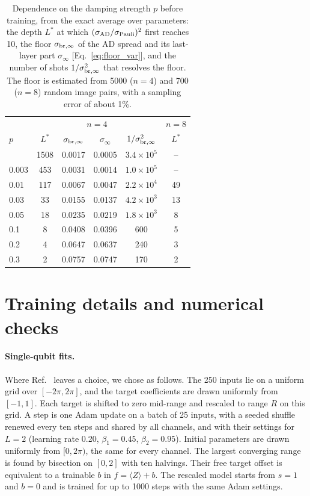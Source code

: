 \documentclass[
 aps,pra,
 twocolumn,
 superscriptaddress,
 longbibliography,
 nofootinbib
]{revtex4-2}
\newcommand{\AD}{\mathrm{AD}}
\begin{document}
\begin{table}[t]
\caption{Dependence on the damping strength $p$ before training, from the
exact average over parameters: the depth $L^*$ at which
$(\sigma_{\AD}/\sigma_{\rm Pauli})^2$ first reaches 10, the floor
$\sigma_{\rm br,\infty}$ of the AD spread and its last-layer part $\sigma_\infty$
[Eq.~\eqref{eq:floor_var}], and the number of shots
$1/\sigma_{\rm br,\infty}^2$ that resolves the floor. The floor is estimated from 5000 ($n=4$) and 700 ($n=8$) random image pairs, with a sampling error of about 1\%.}
\label{tab:pdep}
\begin{ruledtabular}
\begin{tabular}{lccccc}
 & \multicolumn{4}{c}{$n=4$} & $n=8$\\
$p$ & $L^*$ & $\sigma_{\rm br,\infty}$ & $\sigma_\infty$ & $1/\sigma_{\rm br,\infty}^2$ & $L^*$\\
\colrule
0.001 & 1508 & 0.0017 & 0.0005 & $3.4\times10^5$ & --\\
0.003 & 453 & 0.0031 & 0.0014 & $1.0\times10^5$ & --\\
0.01 & 117 & 0.0067 & 0.0047 & $2.2\times10^4$ & 49\\
0.03 & 33 & 0.0155 & 0.0137 & $4.2\times10^3$ & 13\\
0.05 & 18 & 0.0235 & 0.0219 & $1.8\times10^3$ & 8\\
0.1 & 8 & 0.0408 & 0.0396 & 600 & 5\\
0.2 & 4 & 0.0647 & 0.0637 & 240 & 3\\
0.3 & 2 & 0.0757 & 0.0747 & 170 & 2\\
\end{tabular}
\end{ruledtabular}
\end{table}

\section{Training details and numerical checks}
\label{app:training}

\paragraph{Single-qubit fits.}
Where Ref.~\cite{vanrossum2026biased} leaves a choice, we chose as follows. The
250 inputs lie on a uniform grid over $[-2\pi,2\pi]$, and the target
coefficients are drawn uniformly from $[-1,1]$. Each target is shifted to zero
mid-range and rescaled to range $R$ on this grid. A step is one Adam update on a
batch of 25 inputs, with a seeded shuffle renewed every ten steps and shared by
all channels, and with their settings for $L=2$
(learning rate 0.20, $\beta_1=0.45$, $\beta_2=0.95$). Initial parameters are
drawn uniformly from $[0,2\pi)$, the same for every channel. The largest
converging range is found by bisection on $[0,2]$ with ten halvings. Their free
target offset is equivalent to a trainable
$b$ in $f=\langle Z\rangle+b$. The rescaled model starts from $s=1$ and $b=0$
and is trained for up to 1000 steps with the same Adam settings.
\end{document}
